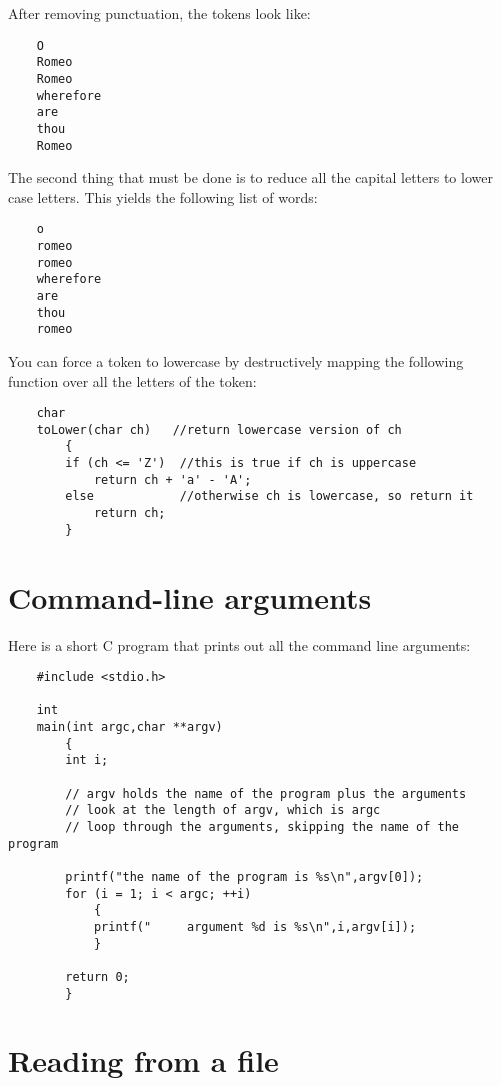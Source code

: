 \documentclass[12pt]{article}
\begin{document}
After removing punctuation, the tokens look like:

\begin{verbatim}
    O
    Romeo
    Romeo
    wherefore
    are
    thou
    Romeo
\end{verbatim}

The second thing that must be done is to reduce all the
capital letters to lower case letters.
This yields the following
list of words:

\begin{verbatim}
    o
    romeo
    romeo
    wherefore
    are
    thou
    romeo
\end{verbatim}

You can force a token to lowercase by destructively mapping the following
function over all the letters of the token:

\begin{verbatim}
    char
    toLower(char ch)   //return lowercase version of ch
        {
        if (ch <= 'Z')  //this is true if ch is uppercase
            return ch + 'a' - 'A';
        else            //otherwise ch is lowercase, so return it
            return ch;
        }
\end{verbatim}
            
\section*{Command-line arguments}

Here is a short C program that prints out all the command
line arguments:

\begin{verbatim}
    #include <stdio.h>

    int
    main(int argc,char **argv)
        {
        int i;

        // argv holds the name of the program plus the arguments
        // look at the length of argv, which is argc
        // loop through the arguments, skipping the name of the program

        printf("the name of the program is %s\n",argv[0]);
        for (i = 1; i < argc; ++i)
            {
            printf("     argument %d is %s\n",i,argv[i]);
            }

        return 0;
        }
\end{verbatim}

\section*{Reading from a file}
\end{document}
